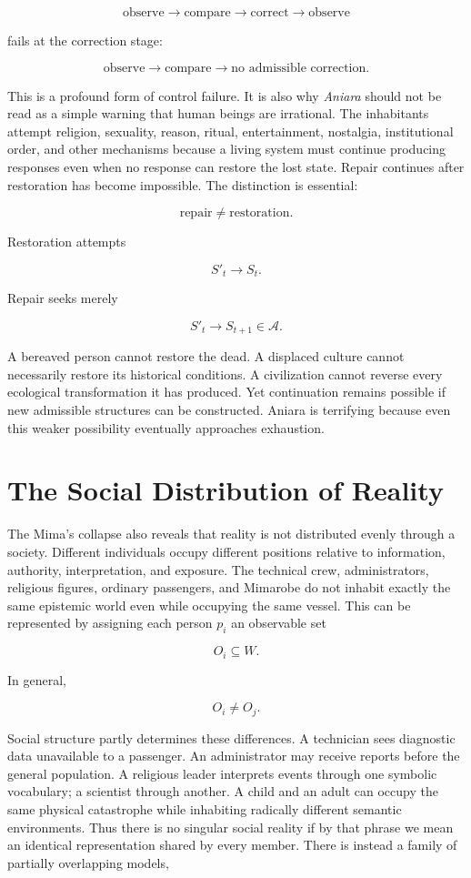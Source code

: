 \documentclass[11pt,oneside]{book}
\theoremstyle{definition}
\theoremstyle{remark}
\begin{document}
\[
\text{observe} \rightarrow \text{compare} \rightarrow \text{correct} \rightarrow \text{observe}
\]

fails at the correction stage:

\[
\text{observe} \rightarrow \text{compare} \rightarrow \boxed{\text{no admissible correction}}.
\]

This is a profound form of control failure. It is also why \emph{Aniara} should not be read as a
simple warning that human beings are irrational. The inhabitants attempt religion, sexuality,
reason, ritual, entertainment, nostalgia, institutional order, and other mechanisms because a living
system must continue producing responses even when no response can restore the lost state. Repair
continues after restoration has become impossible. The distinction is essential:

\[
\text{repair}\neq\text{restoration}.
\]

Restoration attempts

\[
S'_t\rightarrow S_t.
\]

Repair seeks merely

\[
S'_t\rightarrow S_{t+1}\in\mathcal{A}.
\]

A bereaved person cannot restore the dead. A displaced culture cannot necessarily restore its
historical conditions. A civilization cannot reverse every ecological transformation it has
produced. Yet continuation remains possible if new admissible structures can be constructed. Aniara
is terrifying because even this weaker possibility eventually approaches exhaustion.

\section{The Social Distribution of Reality}

The Mima's collapse also reveals that reality is not distributed evenly through a society. Different
individuals occupy different positions relative to information, authority, interpretation, and
exposure. The technical crew, administrators, religious figures, ordinary passengers, and Mimarobe
do not inhabit exactly the same epistemic world even while occupying the same vessel. This can be
represented by assigning each person \(p_i\) an observable set

\[
O_i\subseteq W.
\]

In general,

\[
O_i\neq O_j.
\]

Social structure partly determines these differences. A technician sees diagnostic data unavailable
to a passenger. An administrator may receive reports before the general population. A religious
leader interprets events through one symbolic vocabulary; a scientist through another. A child and
an adult can occupy the same physical catastrophe while inhabiting radically different semantic
environments. Thus there is no singular social reality if by that phrase we mean an identical
representation shared by every member. There is instead a family of partially overlapping models,
\end{document}
